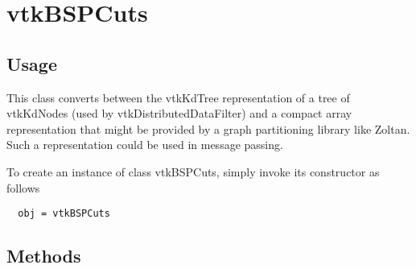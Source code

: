 \section{vtkBSPCuts}

\subsection{Usage}

    This class converts between the vtkKdTree 
    representation of a tree of vtkKdNodes (used by vtkDistributedDataFilter)
    and a compact array representation that might be provided by a 
    graph partitioning library like Zoltan.  Such a representation
    could be used in message passing.
     

To create an instance of class vtkBSPCuts, simply
invoke its constructor as follows
\begin{verbatim}
  obj = vtkBSPCuts
\end{verbatim}
\subsection{Methods}

